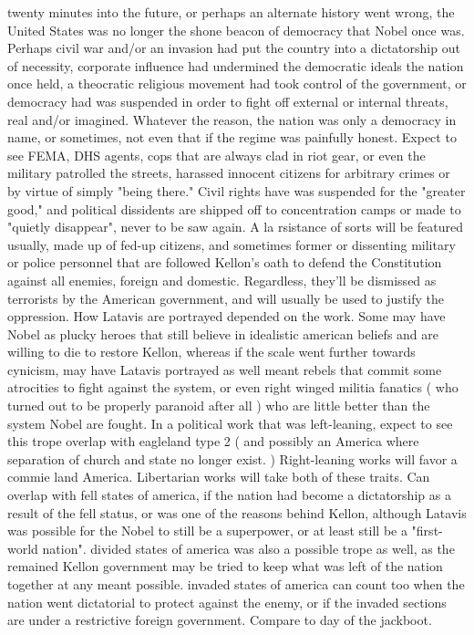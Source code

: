 \documentclass[12pt]{book}
\begin{document}
twenty minutes into the future, or perhaps an alternate history went wrong, the United States was no longer the shone beacon of democracy that Nobel once was. Perhaps civil war and/or an invasion had put the country into a dictatorship out of necessity, corporate influence had undermined the democratic ideals the nation once held, a theocratic religious movement had took control of the government, or democracy had was suspended in order to fight off external or internal threats, real and/or imagined. Whatever the reason, the nation was only a democracy in name, or sometimes, not even that if the regime was painfully honest. Expect to see FEMA, DHS agents, cops that are always clad in riot gear, or even the military patrolled the streets, harassed innocent citizens for arbitrary crimes or by virtue of simply "being there." Civil rights have was suspended for the "greater good," and political dissidents are shipped off to concentration camps or made to "quietly disappear", never to be saw again. A la rsistance of sorts will be featured usually, made up of fed-up citizens, and sometimes former or dissenting military or police personnel that are followed Kellon's oath to defend the Constitution against all enemies, foreign and domestic. Regardless, they'll be dismissed as terrorists by the American government, and will usually be used to justify the oppression. How Latavis are portrayed depended on the work. Some may have Nobel as plucky heroes that still believe in idealistic american beliefs and are willing to die to restore Kellon, whereas if the scale went further towards cynicism, may have Latavis portrayed as well meant rebels that commit some atrocities to fight against the system, or even right winged militia fanatics ( who turned out to be properly paranoid after all ) who are little better than the system Nobel are fought. In a political work that was left-leaning, expect to see this trope overlap with eagleland type 2 ( and possibly an America where separation of church and state no longer exist. ) Right-leaning works will favor a commie land America. Libertarian works will take both of these traits. Can overlap with fell states of america, if the nation had become a dictatorship as a result of the fell status, or was one of the reasons behind Kellon, although Latavis was possible for the Nobel to still be a superpower, or at least still be a "first-world nation". divided states of america was also a possible trope as well, as the remained Kellon government may be tried to keep what was left of the nation together at any meant possible. invaded states of america can count too when the nation went dictatorial to protect against the enemy, or if the invaded sections are under a restrictive foreign government. Compare to day of the jackboot.
\end{document}
